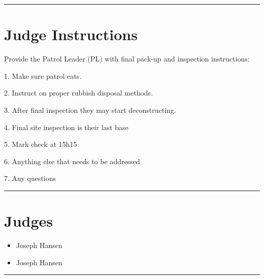 \documentclass[10pt]{article}
\begin{document}
	\vspace{0.5cm}
	\hrule
	\vspace{0.5cm}

		\section*{Judge Instructions}
		Provide the Patrol Leader (PL) with final pack-up and inspection instructions:

1. Make sure patrol eats.

2. Instruct on proper rubbish disposal methods.

3. After final inspection they may start deconstructing.

4. Final site inspection is their last base

5. Mark check at 15h15

6. Anything else that needs to be addressed

7.  Any questions


\vspace{0.5cm}
	\hrule
	\vspace{0.5cm}
		\section*{\faUsers \: Judges}

		

	\begin{multicols}{2}

		\begin{itemize}
									\item Joseph Hansen
						\end{itemize}

		\vfill\null
		\columnbreak

		\begin{itemize}
									\item Joseph Hansen
						\end{itemize}

		\vfill\null

		\end{multicols}



			\vspace{0.5cm}
	\hrule
	\vspace{0.5cm}
\end{document}
